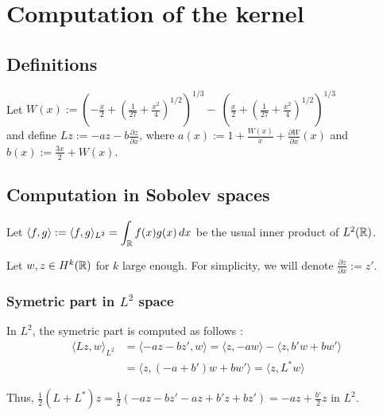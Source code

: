 \documentclass[11pt,a4paper]{article}
\begin{document}
\newpage
\appendix

\section{Computation of the kernel}

\subsection{Definitions}

Let $W(x) := \left( -\frac{x}{2} + \left( \frac{1}{27} + \frac{x^2}{4} \right)^{1/2} \right)^{1/3} -\  \left( \frac{x}{2} + \left( \frac{1}{27} + \frac{x^2}{4} \right)^{1/2} \right)^{1/3}$ \\


and define $Lz := -az - b\frac{\partial z}{\partial x} $, where $a(x):= 1+\frac{W(x)}{x}+\frac{\partial W}{\partial x} (x)$ and $b(x):= \frac{3x}{2} + W(x)$.

\subsection{Computation in Sobolev spaces}

Let $\langle f, g \rangle := \langle f, g \rangle_{L^2} = \displaystyle \int_\mathbb R  f(x)g(x)\,dx$ be the usual inner product of $L^2(\mathbb R)$.

Let $w,z \in H^k(\mathbb R)$ for $k$ large enough. For simplicity, we will denote $\frac{\partial z}{\partial x} := z'$.

\subsubsection{Symetric part in $L^2$ space}
In $L^2$, the symetric part is computed as follows :
\begin{align*}
  \langle Lz, w \rangle_{L^2}  &=   \langle -az - bz', w \rangle =  \langle z, -aw \rangle  -   \langle z, b'w+bw' \rangle    \\
                  &= \langle z, (-a+b')w + bw' \rangle = \langle z, L^*w \rangle
\end{align*}

Thus, $\frac{1}{2}(L+L^*)z = \frac{1}{2}(-az-bz' -az +b'z+bz') \displaystyle =-az+\frac{b'}{2}z$ in $L^2$.
\end{document}
